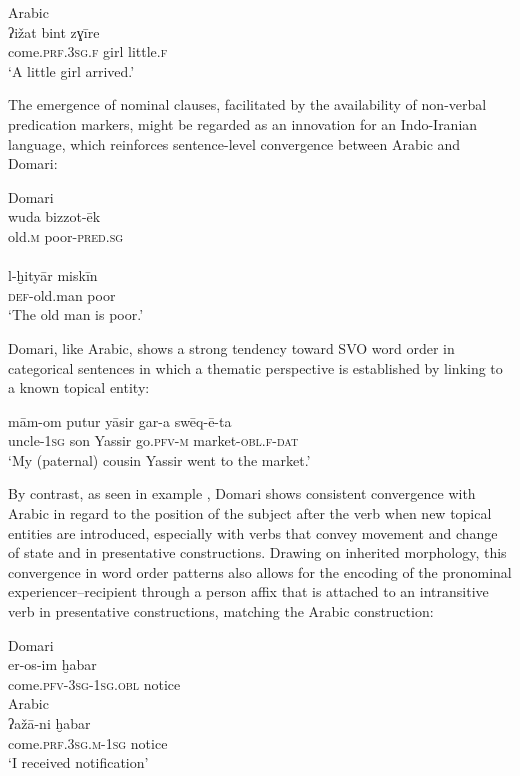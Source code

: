\documentclass[output=paper]{langsci/langscibook}
\begin{document}
\ex
{Arabic}\\
\gll ʔižat bint zɣīre  \\
       come.\textsc{prf.3sg.f} girl little.\textsc{f}\\
\glt   ‘A little girl arrived.’ \label{girlc}
\z
\z

The emergence of nominal clauses, facilitated by the availability of non-verbal predication markers, might be regarded as an innovation for an Indo-Iranian language, which reinforces sentence-level convergence between Arabic and Domari:

\ea
\ea
{Domari}\\
\gll wuda bizzot-ēk  \\
     old.\textsc{m} poor-\textsc{pred.sg}\\
     
\\
\gll l-ḫityār miskīn  \\
     \textsc{def}{}-old.man poor\\
\glt ‘The old man is poor.’
\z
\z

Domari, like Arabic, shows a strong tendency toward SVO word order in categorical sentences in which a thematic perspective is established by linking to a known topical entity:

\ea \gll mām-om putur yāsir gar-a swēq-ē-ta\\
         uncle-\textsc{1sg} son Yassir go.\textsc{pfv-m} market-\textsc{obl.f-dat}\\
\glt     ‘My (paternal) cousin Yassir went to the market.’
\z

By contrast, as seen in example , Domari shows consistent convergence with Arabic in regard to the position of the subject after the verb when new topical entities are introduced, especially with verbs that convey movement and change of state and in presentative constructions. Drawing on inherited morphology, this convergence in word order patterns also allows for the encoding of the pronominal experiencer--recipient through a person affix that is attached to an intransitive verb in presentative constructions, matching the Arabic construction:

\newpage

\ea
\ea
{Domari}\\
\gll er-os-im ḫabar    \\
     come.\textsc{pfv-3sg-1sg.obl}  notice\\
\ex
{Arabic}\\
\gll  ʔažā-ni  ḫabar  \\
     come.\textsc{prf.3sg.m-1sg} notice\\
\glt ‘I received notification’
\z
\z
\end{document}
